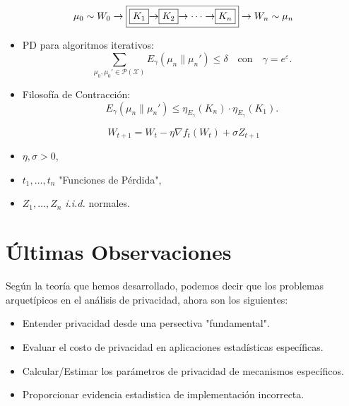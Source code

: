 \begin{equation*}
    \mu_0\sim W_0\to\fbox{\fbox{$K_1$}$\to$\fbox{$K_2$}$\to\cdots\to$\fbox{$K_n$}}\to W_n\sim\mu_n
\end{equation*}

\begin{itemize}
    \item PD para algoritmos iterativos:
    \begin{equation*}
        \sum_{\mu_0,\mu_0'\in\mathcal{P}(\mathcal{X})}E_{\gamma}(\mu_n\|\mu_n')\leq\delta\quad\text{con}\quad\gamma=e^\varepsilon.
    \end{equation*}
    \item Filosof\'ia de Contracci\'on:
    \begin{equation*}
        E_\gamma(\mu_n\|\mu_n')\leq\eta_{E_\gamma}(K_n)\cdot\eta_{E_\gamma}(K_1).
    \end{equation*}
\end{itemize}

\begin{example}
\begin{equation*}
    W_{t+1}=W_t-\eta\nabla f_t(W_t)+\sigma Z_{t+1}
\end{equation*}
\begin{itemize}
    \item $\eta,\sigma>0$,
    \item $t_1,\dots,t_n$ "Funciones de P\'erdida",
    \item $Z_1,\dots,Z_n$ \textit{i.i.d.} normales.
\end{itemize}
\end{example}

\section{\'Ultimas Observaciones}

Seg\'un la teor\'ia que hemos desarrollado, podemos decir que los problemas arquet\'ipicos en el an\'alisis de privacidad, ahora son los siguientes:

\begin{itemize}
    \item Entender privacidad desde una persectiva "fundamental". 
    \item Evaluar el costo de privacidad en aplicaciones estad\'isticas espec\'ificas.
    \item Calcular/Estimar los par\'ametros de privacidad de mecanismos espec\'ificos. 
    \item Proporcionar evidencia estadistica de implementaci\'on incorrecta. 
\end{itemize}

